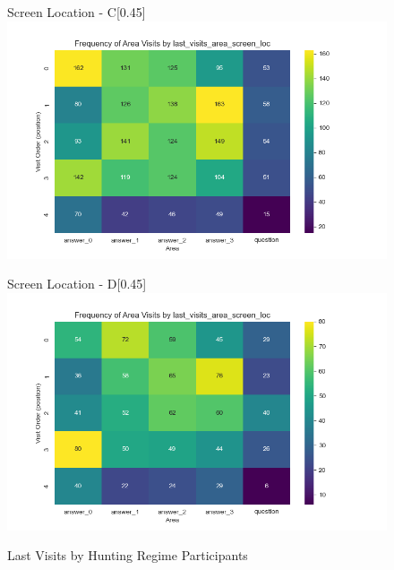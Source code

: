 \documentclass[manuscript,review,anonymous]{acmart}
\begin{document}
\begin{figure}[htbp]
        \medskip
    
      \begin{subcaptionbox}{Screen Location - C\label{fig:ccc}}[0.45\textwidth]
        {\centering\includegraphics[width=\linewidth]{plots/visits/matrix__last_visits_area_screen_loc_hunters_C.png}}
      \end{subcaptionbox}
      \hfill
      \begin{subcaptionbox}{Screen Location - D\label{fig:ddd}}[0.45\textwidth]
        {\centering\includegraphics[width=\linewidth]{plots/visits/matrix__last_visits_area_screen_loc_hunters_D.png}}
      \end{subcaptionbox}
      
      \caption{Last Visits by Hunting Regime Participants}
      \label{fig:last_hunt_loc}
    \end{figure}
\end{document}
